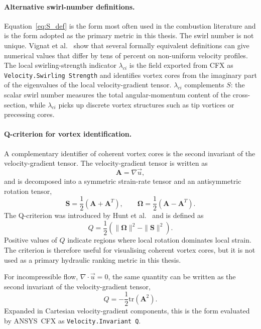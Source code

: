 \paragraph{Alternative swirl-number definitions.}
Equation~\ref{eq:S_def} is the form most often used in the combustion literature and is the form adopted as the primary metric in this thesis. The swirl number is not unique. Vignat et al.~\cite{Vignat2022} show that several formally equivalent definitions can give numerical values that differ by tens of percent on non-uniform velocity profiles. The local swirling-strength indicator $\lambda_{ci}$ is the field exported from CFX as \texttt{Velocity.Swirling Strength} and identifies vortex cores from the imaginary part of the eigenvalues of the local velocity-gradient tensor. $\lambda_{ci}$ complements $S$: the scalar swirl number measures the total angular-momentum content of the cross-section, while $\lambda_{ci}$ picks up discrete vortex structures such as tip vortices or precessing cores.
 
\paragraph{Q-criterion for vortex identification.}
A complementary identifier of coherent vortex cores is the second invariant of the velocity-gradient tensor. The velocity-gradient tensor is written as
\begin{equation}
\mathbf{A} = \nabla \vec{u},
\label{eq:vel_grad_tensor}
\end{equation}
and is decomposed into a symmetric strain-rate tensor and an antisymmetric rotation tensor,
\begin{equation}
\mathbf{S} = \frac{1}{2}\left(\mathbf{A}+\mathbf{A}^{T}\right),
\qquad
\boldsymbol{\Omega} = \frac{1}{2}\left(\mathbf{A}-\mathbf{A}^{T}\right).
\label{eq:strain_rotation_tensors}
\end{equation}
The Q-criterion was introduced by Hunt et al.~\cite{Hunt1988} and is defined as
\begin{equation}
Q =
\frac{1}{2}
\left(
\|\boldsymbol{\Omega}\|^{2}
-
\|\mathbf{S}\|^{2}
\right).
\label{eq:Q_def}
\end{equation}
Positive values of \(Q\) indicate regions where local rotation dominates local strain. The criterion is therefore useful for visualising coherent vortex cores, but it is not used as a primary hydraulic ranking metric in this thesis.

For incompressible flow, \(\nabla \cdot \vec{u}=0\), the same quantity can be written as the second invariant of the velocity-gradient tensor,
\begin{equation}
Q
=
-\frac{1}{2}\mathrm{tr}\left(\mathbf{A}^{2}\right).
\label{eq:Q_trace}
\end{equation}
Expanded in Cartesian velocity-gradient components, this is the form evaluated by ANSYS~CFX as \texttt{Velocity.Invariant Q}. 

